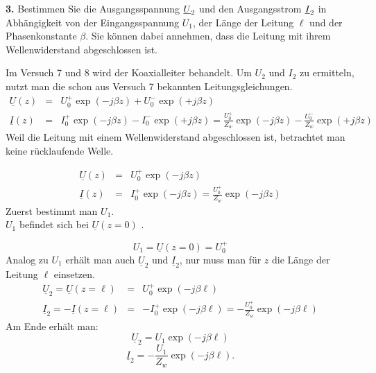\documentclass[Protokollheft.tex]{subfiles}
\begin{document}
\begin{framed}
	\noindent \textbf{3.} Bestimmen Sie die Ausgangsspannung $\underline{U}_2$ und den Ausgangsstrom $\underline{I}_2$ in Abhängigkeit von der Eingangsspannung $U_1$, der Länge der Leitung $\ell$ und der Phasenkonstante $\beta$. Sie können dabei annehmen, dass die Leitung mit ihrem Wellenwiderstand abgeschlossen ist.\label{exer:calcU2I2}
\end{framed}
\noindent
Im Versuch 7 und 8 wird der Koaxialleiter behandelt. Um $U_2$ und $I_2$ zu ermitteln, nutzt man die schon aus Versuch 7 bekannten Leitungsgleichungen.
\begin{eqnarray}
\underline{U}(z)&=&U^{+}_0\exp(-j\beta z)+U^{-}_0\exp(+j\beta z)\\
\underline{I}(z)&=&I^{+}_0\exp(-j\beta z)-I^{-}_0\exp(+j\beta z)=\frac{U^{+}_0}{Z_w}\exp(-j\beta z)-\frac{U^{-}_0}{Z_w}\exp(+j\beta z)
\end{eqnarray}
\noindent
Weil die Leitung mit einem Wellenwiderstand abgeschlossen ist, betrachtet man keine rücklaufende Welle.

\begin{eqnarray}
\underline{U}(z)&=&U^{+}_0\exp(-j\beta z)\\
\underline{I}(z)&=&I^{+}_0\exp(-j\beta z)=\frac{U^{+}_0}{Z_w}\exp(-j\beta z)
\end{eqnarray}
Zuerst bestimmt man $U_1$.\\
$U_1$ befindet sich bei $\underline{U}(z=0)$ . 

$$U_1=\underline{U}(z=0)=U^{+}_0 $$
\noindent
Analog zu $U_1$ erhält man auch $\underline{U}_2$ und $\underline{I}_2 $, nur muss man für $z$ die Länge der Leitung $\ell$ einsetzen. 
\begin{eqnarray}
\underline{U}_2=\underline{U}(z=\ell)&=&U^{+}_0\exp(-j\beta \ell)\\
\underline{I}_2=-\underline{I}(z=\ell)&=&-I^{+}_0\exp(-j\beta \ell)=-\frac{U^{+}_0}{Z_w}\exp(-j\beta \ell)
\end{eqnarray}
Am Ende erhält man:
$$\underline{U}_2=U_1\exp(-j\beta \ell)$$
$$\underline{I}_2=-\frac{U_1}{Z_w}\exp(-j\beta \ell). $$
\end{document}
